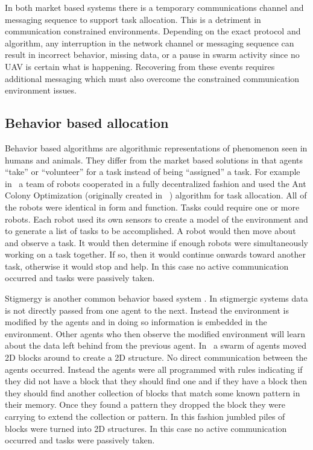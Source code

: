 In both market based systems there is a temporary communications channel and messaging sequence to support task allocation.  This is a detriment in communication constrained environments.  Depending on the exact protocol and algorithm, any interruption in the network channel or messaging sequence can result in incorrect behavior, missing data, or a pause in swarm activity since no UAV is certain what is happening.  Recovering from these events requires additional messaging which must also overcome the constrained communication environment issues.

\subsection{Behavior based allocation}

Behavior based algorithms are algorithmic representations of phenomenon seen in humans and animals. They differ from the market based solutions in that agents ``take'' or ``volunteer'' for a task instead of being ``assigned'' a task.  For example in~\textcite{ant_colony_opt} a team of robots cooperated in a fully decentralized fashion and used the Ant Colony Optimization (originally created in ~\textcite{orig_aco}) algorithm for task allocation.  All of the robots were identical in form and function.  Tasks could require one or more robots.  Each robot used its own sensors to create a model of the environment and to generate a list of tasks to be accomplished.  A robot would then move about and observe a task.  It would then determine if enough robots were simultaneously working on a task together.  If so, then it would continue onwards toward another task, otherwise it would stop and help.  In this case no active communication occurred and tasks were passively taken.

Stigmergy is another common behavior based system \parencite{history_stigmergy} \parencite{social_cog_stigmergy}. In stigmergic systems data is not directly passed from one agent to the next.  Instead the environment is modified by the agents and in doing so information is embedded in the environment.  Other agents who then observe the modified environment will learn about the data left behind from the previous agent.  In~\textcite{stigmergy_building} a swarm of agents moved 2D blocks around to create a 2D structure.  No direct communication between the agents occurred.  Instead the agents were all programmed with rules indicating if they did not have a block that they should find one and if they have a block then they should find another collection of blocks that match some known pattern in their memory.  Once they found a pattern they dropped the block they were carrying to extend the collection or pattern.  In this fashion jumbled piles of blocks were turned into 2D structures.  In this case no active communication occurred and tasks were passively taken.

